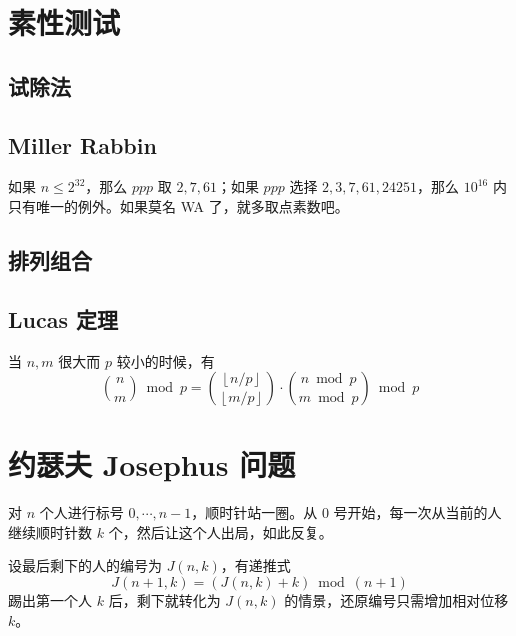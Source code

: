 \documentclass{probook}
\begin{document}
\begin{multicols}{2}


\section{素性测试}

\subsection{试除法}



\subsection{Miller Rabbin}

如果 $n\leqslant 2^{32}$，那么 $ppp$ 取 $2,7,61$；如果 $ppp$ 选择 $2,3,7,61,24251$，那么 $10^{16}$ 内只有唯一的例外。如果莫名 WA 了，就多取点素数吧。



\subsection{排列组合}

\subsection{Lucas 定理}

当 $n,m$ 很大而 $p$ 较小的时候，有
\[  
\binom{n}{m}\bmod p = \binom{\left\lfloor n/p \right\rfloor}{\left\lfloor m/p\right\rfloor}\cdot\binom{n\bmod p}{m\bmod p}\bmod p 
\]



\section{约瑟夫 Josephus 问题}

对 $n$ 个人进行标号 $0,\cdots,n-1$，顺时针站一圈。从 $0$ 号开始，每一次从当前的人继续顺时针数 $k$ 个，然后让这个人出局，如此反复。

设最后剩下的人的编号为 $J(n,k)$，有递推式
\[J(n+1,k) = (J(n,k)+k) \bmod (n+1)\]
踢出第一个人 $k$ 后，剩下就转化为 $J(n,k)$ 的情景，还原编号只需增加相对位移 $k$。




\end{multicols}
\end{document}

